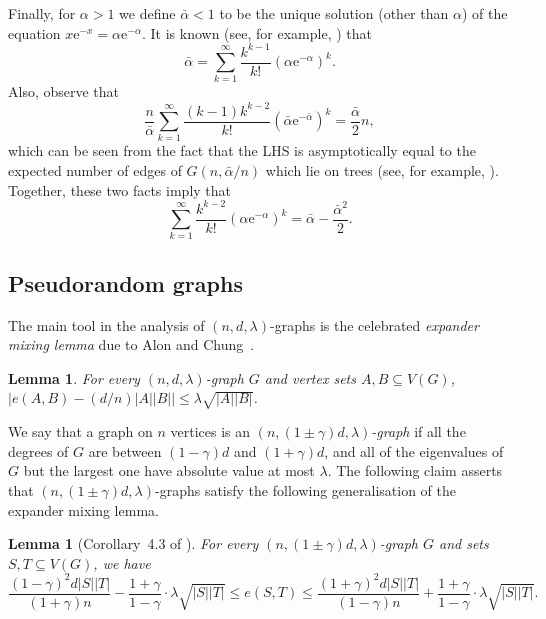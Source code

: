 \documentclass[reqno,a4paper]{amsart}
\newtheorem{lemma}[theorem]{Lemma}
\theoremstyle{definition}
\newcommand{\eps}{\varepsilon}
\newcommand{\e}{\mathrm{e}}
\newcommand{\Po}{\mathrm{Po}}
\begin{document}
Finally, for $\alpha > 1$ we define $\bar{\alpha} < 1$ to be the unique solution (other than $\alpha$) of the equation $x\e^{-x}=\alpha \e^{-\alpha}$. It is known (see, for example, \cite{ErdosRenyi1960}) that 
\[
    \bar{\alpha}=\sum_{k=1}^\infty \frac{k^{k-1}}{k!}\left(\alpha\e^{-\alpha}\right)^k.
\]
Also, observe that 
\[
    \frac{n}{\bar{\alpha}}\sum_{k=1}^\infty \frac{(k-1)k^{k-2}}{k!} \left(\bar{\alpha}\e^{-\bar{\alpha}}\right)^{k}=\frac{\bar{\alpha}}{2}n,
\]
which can be seen from the fact that the LHS is asymptotically equal to the expected number of edges of $G(n,\bar{\alpha}/n)$ which lie on trees (see, for example, \cite{FKM04}). Together, these two facts imply that
\begin{equation}\label{eq: standard by now tool}
    \sum_{k=1}^\infty \frac{k^{k-2}}{k!} \left(\alpha\e^{-\alpha}\right)^{k}=\bar{\alpha}-\frac{\bar{\alpha}^2}{2}.
\end{equation}

\subsection{Pseudorandom graphs}

The main tool in the analysis of $(n,d,\lambda)$-graphs is the celebrated \textit{expander mixing lemma} due to Alon and Chung~\cite{AC88}.
\begin{lemma}\label{l: eml}
For every $(n,d,\lambda)$-graph $G$ and vertex sets $A,B\subseteq V(G)$, $|e(A,B)-(d/n)|A||B||\le \lambda\sqrt{|A||B|}$.
\end{lemma}


We say that a graph on $n$ vertices is an \textit{$(n,(1\pm \gamma)d,\lambda)$-graph} if all the degrees of $G$ are between $(1-\gamma)d$ and $(1+\gamma)d$, and all of the eigenvalues of $G$ but the largest one have absolute value at most $\lambda$. The following claim asserts that $(n,(1\pm \gamma)d,\lambda)$-graphs satisfy the following generalisation of the expander mixing lemma.
\begin{lemma}[Corollary~4.3 of \cite{FHMV25}]\label{cor:EML-almost-regular}
For every $(n,(1\pm\gamma)d,\lambda)$-graph $G$ and sets $S,T\subseteq V(G)$, we have
    \begin{equation}    \label{eq: EML-almost-regular}
        \frac{(1-\gamma)^2d|S||T|}{(1+\gamma)n}-\frac{1+\gamma}{1-\gamma}\cdot \lambda \sqrt{|S||T|}
        \leq e(S,T)
        \leq \frac{(1+\gamma)^2d|S||T|}{(1-\gamma)n}+\frac{1+\gamma}{1-\gamma}\cdot \lambda \sqrt{|S||T|}.   
    \end{equation}
\end{lemma}
\end{document}
